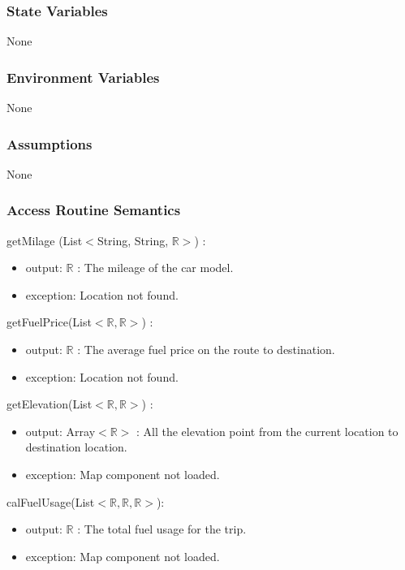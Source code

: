 \documentclass[12pt, titlepage]{article}
\begin{document}
\subsubsection{State Variables}

None

\subsubsection{Environment Variables}

None

\subsubsection{Assumptions}

None

\subsubsection{Access Routine Semantics}

\noindent getMilage (List$<$String, String, $\mathbb{R}>$) :
\begin{itemize}
\item output: $\mathbb{R}$ : The mileage of the car model.
\item exception: Location not found.
\end{itemize}

\noindent getFuelPrice(List$<\mathbb{R},\mathbb{R}>$) :
\begin{itemize}
\item output: $\mathbb{R}$ : The average fuel price on the route to destination.
\item exception: Location not found.
\end{itemize}

\noindent getElevation(List$<\mathbb{R},\mathbb{R}>$) :
\begin{itemize}
\item output: Array$<\mathbb{R}>$ : All the elevation point from the current location to destination location.
\item exception: Map component not loaded.
\end{itemize}

\noindent calFuelUsage(List$<\mathbb{R},\mathbb{R},\mathbb{R}>$):
\begin{itemize}
\item output: $\mathbb{R}$ : The total fuel usage for the trip.
\item exception: Map component not loaded.
\end{itemize}
\end{document}
